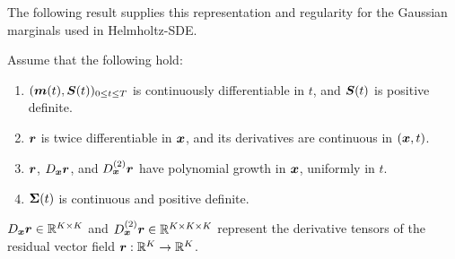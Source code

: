 The following result supplies this representation and regularity for the Gaussian marginals used in Helmholtz-SDE.
 
\begin{assumption}\label{app:assum:resid}
    Assume that the following hold:
    \begin{enumerate}[label=(\roman*)]
        \item\label{item:ass:cont} $(\boldsymbol{m}(t), \boldsymbol{S}(t))_{0 \leq t \leq T}$ is continuously differentiable in $t$, and $\boldsymbol{S}(t)$ is positive definite.
        \item\label{item:ass:diff} $\boldsymbol{r}$ is twice differentiable in $\boldsymbol{x}$, and its derivatives are continuous in $(\boldsymbol{x}, t)$.
        \item\label{item:ass:poly} $\boldsymbol{r}$, $D_{\boldsymbol{x}} \boldsymbol{r}$, and $D_{\boldsymbol{x}}^{(2)}\boldsymbol{r}$ have polynomial growth in $\boldsymbol{x}$, uniformly in $t$.
        \item\label{item:ass:cont-sigma} $\boldsymbol{\Sigma}(t)$ is continuous and positive definite.
    \end{enumerate}  
    $D_{\boldsymbol{x}} \boldsymbol{r} \in \mathbb{R}^{K \times K}$ and $D_{\boldsymbol{x}}^{(2)} \boldsymbol{r} \in \mathbb{R}^{K \times K \times K}$ represent the derivative tensors of the residual vector field $\boldsymbol{r}: \mathbb{R}^K \to \mathbb{R}^K$. 
\end{assumption}

